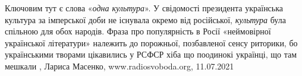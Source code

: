 Ключовим тут є слова «\emph{одна культура}». У свідомості президента українська
культура за імперської доби не існувала окремо від російської, \emph{культура} була
спільною для обох народів. Фраза про популярність в Росії «неймовірної
української літератури» належить до порожньої, позбавленої сенсу риторики, бо
українськими творами цікавились у РСФСР хіба що поодинокі українці, що там
мешкали
, 
Лариса Масенко, www.radiosvoboda.org, 11.07.2021
